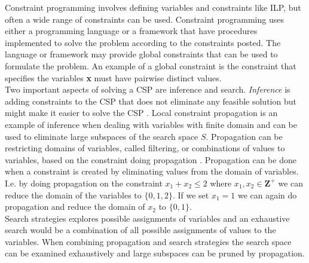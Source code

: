 Constraint programming involves defining variables and constraints like ILP, but often a wide range of constraints can 
be used. Constraint programming uses either a programming language or a framework that have procedures implemented to 
solve the problem according to the constraints posted. The language or framework may provide global constraints that 
can be used to formulate the problem. An example of a global constraint is the {} 
constraint that specifies the variables \textbf{x} 
must have pairwise distinct values.  \\ 
Two important aspects of solving a CSP are inference and search. \emph{Inference} is adding constraints to the CSP that 
does not eliminate any feasible solution but might make it easier to solve the CSP \cite[p.301]{CPbog}. 
Local constraint propagation is an example of inference when dealing with variables with finite domain and can be used 
to eliminate large subspaces of the search space $S$. Propagation can be restricting domains of variables, called 
filtering, or combinations of values to variables, based on the constraint doing propagation \cite[p. 169]{CPbog}. 
Propagation can be done when a constraint is created by eliminating values from the domain of variables. I.e. by 
doing propagation on the constraint $x_1 + x_2 \leq 2$ where $x_1,x_2 \in \mathbf{Z}^+$ we can reduce the domain of the 
variables to $\{0,1,2\}$. If we set $x_1 =1$ we can again do propagation and reduce the domain of $x_2$ to $\{0,1\}$. 
\\ 
Search strategies explores possible assignments of variables and an exhaustive search would be a combination of all 
possible assignments of values to the variables. When combining propagation and search strategies the search space can 
be examined exhaustively and large subspaces can be pruned by propagation. \\ 
